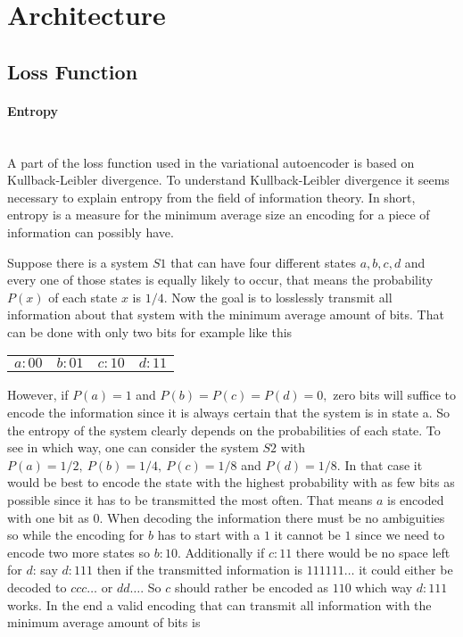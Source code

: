 \section{Architecture}
\subsection{Loss Function}

\paragraph{Entropy}\mbox{}\\

A part of the loss function used in the variational autoencoder is based on Kullback-Leibler divergence.
To understand Kullback-Leibler divergence it seems necessary to explain entropy from
the field of information theory. In short, entropy is a measure for the minimum average size an
encoding for a piece of information can possibly have.

Suppose there is a system $S1$ that can have four different states $a, b, c, d$
and every one of those states is equally likely to occur, that means the probability $P(x)$
of each state $x$ is $1/4$. Now the goal is to losslessly transmit all information about that system
with the minimum average amount of bits. That can be done with only two bits for example like this

\begin{center}
    \begin{tabular} {c c c c}
        $a: 00$ & $b: 01$ & $c: 10$ & $d: 11$
    \end{tabular}
\end{center}

However, if $P(a)=1$ and $P(b)=P(c)=P(d)=0,$ zero bits will suffice to encode the information since
it is always certain that the system is in state a. So the entropy of the system clearly depends on
the probabilities of each state. To see in which way, one can consider the system $S2$ with 
$P(a)=1/2,\ P(b)=1/4,\ P(c)=1/8$ and $P(d)=1/8$. In that case it would be best to encode the state
with the highest probability with as few bits as possible since it has to be transmitted the most
often. That means $a$ is encoded with one bit as $0$. When decoding the information there must be
no ambiguities so while the encoding for $b$ has to start with a $1$ it cannot be $1$ since we need 
to encode two more states so $b: 10$. Additionally if $c: 11$ there would be no space left for $d$:
say $d: 111$ then if the transmitted information is $111111\dots$ it could either be decoded to
$ccc\dots$ or $dd\dots$. So $c$ should rather be encoded as $110$ which way $d: 111$ works. In the end a valid
encoding that can transmit all information with the minimum average amount of bits is

